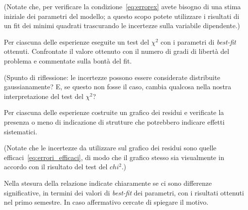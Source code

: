 \documentclass{lab1-article}
\begin{document}
\begin{article}
(Notate che, per verificare la condizione~\eqref{eq:errorex} avete bisogno di
una stima iniziale dei parametri del modello; a questo scopo potete utilizzare
i risultati di un fit dei minimi quadrati trascurando le incertezze sulla
variabile dipendente.)



Per ciascuna delle esperienze eseguite un test del $\chi^2$ con i parametri di
\emph{best-fit} ottenuti. Confrontate il valore ottenuto con il numero di gradi
di libert\`a del problema e commentate sulla bont\`a del fit.

(Spunto di riflessione: le incertezze possono essere considerate distribuite
gaussianamente? E, se questo non fosse il caso, cambia qualcosa nella nostra
interpretazione del test del $\chi^2$?



Per ciascuna delle esperienze costruite un grafico dei residui e
verificate la presenza o meno di indicazione di strutture che potrebbero
indicare effetti sistematici.

(Notate che le incertezze da utilizzare sul grafico dei residui sono quelle
efficaci~\eqref{eq:errori_efficaci}, di modo che il grafico stesso sia
visualmente in accordo con il risultato del test del $chi^2$.)


\secconsiderations

Nella stesura della relazione indicate chiaramente se ci sono differenze
significative, in termini dei valori di \emph{best-fit} dei parametri, con i
risultati ottenuti nel primo semestre. In caso affermativo cercate di spiegare
il motivo.


\end{article}
\end{document}
